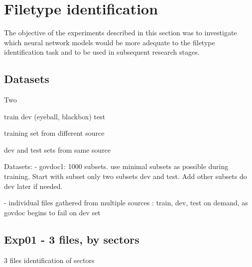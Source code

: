 \section{Filetype identification}
The objective of the experiments described in this section was to investigate which neural network models would be more adequate to the filetype identification task and to be used in subsequent research stages.
\subsection{Datasets}
Two 


train
dev (eyeball, blackbox)
test

training set from different source

dev and test sets from same source

Datasets:
- govdoc1: 1000 subsets. use minimal subsets as possible during training.
Start with subset only two subsets dev and test. Add other subsets do dev later if needed.

- individual files gathered from multiple sources : train, dev, test
on demand, as govdoc begins to fail on dev set




\subsection{Exp01 - 3 files, by sectors}
3 files
identification of sectors
